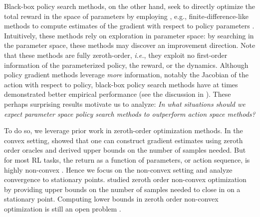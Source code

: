 Black-box policy search methods, on the other hand, seek to directly
optimize the total reward in the space of parameters by employing
, e.g., finite-difference-like methods to compute estimates of the
gradient with respect to policy parameters
\citep{bagnell2001autonomous,mannor2003cross,heidrich2008evolution,tesch2011using,sehnke2010parameter,salimans2017evolution,mania2018simple}.  
Intuitively, these methods rely on exploration in parameter space: by
searching in the parameter space, these methods may discover an
improvement direction. Note that these methods are fully zeroth-order,
\textit{i.e.}, they exploit no first-order information of the
parameterized policy, the reward, or the dynamics.  Although policy gradient methods leverage \textit{more} information,
notably the Jacobian of the action with respect to policy, black-box policy search methods have
at times demonstrated better empirical performance (see the discussion in 
\citep{kober2013reinforcement, mania2018simple}). These perhaps surprising results motivate us to analyze:
\textit{In
  what situations should we expect parameter space policy search methods
  to outperform action space methods?}

To do so, we leverage prior work in zeroth-order
optimization methods. In the convex setting, 
\citep{flaxman2005online, agarwal2010optimal, nesterov2017random}
showed that one can construct %
gradient %
estimates using zeroth order oracles and derived upper bounds on the
number of samples needed. 
%
%
%
But for most RL tasks,
the return as a function of parameters, or action sequence, is highly
non-convex \citep{sutton1998introduction}. Hence we focus on the non-convex setting and analyze convergence to stationary points. \cite{ghadimi2013stochastic, nesterov2017random} studied zeroth order
non-convex optimization by providing upper bounds on
the number of samples needed to close in on a stationary
point. Computing lower bounds in zeroth order non-convex optimization is still
an open problem %
%
\citep{carmon2017lower, carmon2017lower2}. 

